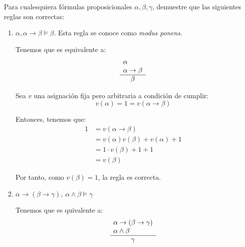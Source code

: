 \begin{ejercicio*}
    Para cualesquiera fórmulas proposicionales $\alpha,\beta,\gamma$, demuestre que las siguientes reglas son correctas:

    \begin{enumerate}
        \item $\alpha,\alpha\rightarrow\beta\models\beta$. Esta regla se conoce como \emph{modus ponens}.
        
        Tenemos que es equivalente a:
        \begin{equation*}
            \begin{array}{l}
                \alpha\\
                \alpha\rightarrow\beta\\ \hline
                \multicolumn{1}{c}{\beta}
            \end{array}
        \end{equation*}

        Sea $v$ una asignación fija pero arbitraria a condición de cumplir:
        \begin{equation*}
            v(\alpha)=1=v(\alpha\rightarrow\beta)
        \end{equation*}

        Entonces, tenemos que:
        \begin{align*}
            1 &= v(\alpha\rightarrow\beta)\\
            &= v(\alpha)v(\beta)+v(\alpha)+1\\
            &= 1\cdot v(\beta)+1+1\\
            &= v(\beta)
        \end{align*}

        Por tanto, como $v(\beta)=1$, la regla es correcta.

        \item $\alpha\rightarrow(\beta\rightarrow\gamma),~\alpha\land\beta \models \gamma$
        
        Tenemos que es quivalente a:
        \begin{equation*}
            \begin{array}{l}
                \alpha\rightarrow(\beta\rightarrow\gamma)\\
                \alpha\land\beta \\ \hline
                \multicolumn{1}{c}{\gamma}
            \end{array}
        \end{equation*}
        

\end{enumerate}
\end{ejercicio*}
